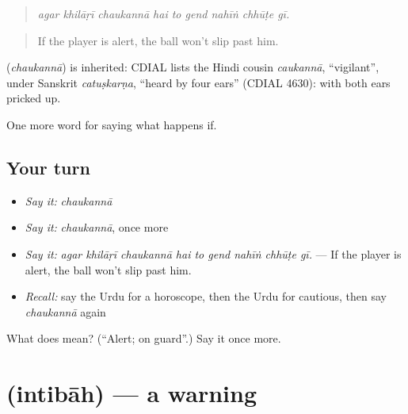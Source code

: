 \begin{quote}
\emph{agar khilāṛī chaukannā hai to gend nahīṅ chhūṭe gī.}
\end{quote}

\begin{quote}
If the player is alert, the ball won't slip past him.
\end{quote}

\begin{cousinweb}
\textbf{} (\emph{chaukannā}) is inherited: CDIAL lists the Hindi cousin \emph{caukannā}, \textquotedblleft{}vigilant\textquotedblright{}, under Sanskrit \emph{catuṣkarṇa}, \textquotedblleft{}heard by four ears\textquotedblright{} (CDIAL 4630): with both ears pricked up.
\end{cousinweb}

\begin{grammarlens}[title={What you've built}]
One more word for saying what happens if.
\end{grammarlens}

\subsection*{Your turn}
\begin{itemize}
\raggedright
  \item \emph{Say it:} \emph{chaukannā}
  \item \emph{Say it:} \emph{chaukannā}, once more
  \item \emph{Say it:} \emph{agar khilāṛī chaukannā hai to gend nahīṅ chhūṭe gī.} — If the player is alert, the ball won't slip past him.
  \item \emph{Recall:} say the Urdu for a horoscope, then the Urdu for cautious, then say \emph{chaukannā} again
\end{itemize}

\begin{tcolorbox}[breakable,colback=teal!4,colframe=teal!35!black,title={Before you move on}]
What does  mean? (\textquotedblleft{}Alert; on guard\textquotedblright{}.) Say it once more.
\end{tcolorbox}
\section[\texorpdfstring{\ur{انتباہ} (intibāh)}{انتباہ (intibāh)}]{ (intibāh) — a warning}

\label{lesson:UR-C536-intibah}



